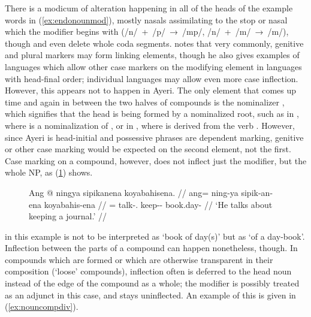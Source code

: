 There is a modicum of alteration happening in all of the heads of the example 
words in (\ref{ex:endonounmod}), mostly nasals assimilating to the stop or 
nasal which the modifier begins with (/n/~+~/p/~→~/mp/, /n/~+~/m/~→~/m/), 
though  and  even delete 
whole coda segments.
\citet[703]{bauer2001} notes that very commonly, genitive and plural markers 
may form linking elements, though he also gives examples of languages which
allow other case markers on the modifying element in languages with head-final
order; individual languages may allow even more case inflection. However, this
appears not to happen in Ayeri. The only element that comes up time and again
in between the two halves of compounds is the nominalizer ,
which signifies that the head is being formed by a nominalized root, such as in
, where  is a 
nominalization of , or in 
, where  is derived 
from the verb . However, since Ayeri is head-initial
and possessive phrases are dependent marking, genitive or other case marking
would be expected on the second element, not the first. Case marking on a
compound, however, does not inflect just the modifier, but the whole NP, as 
(\ref{ex:compinfl}) shows.

\begin{figure}[h]
\ex\label{ex:compinfl}\begingl
	\gla Ang @ ningya sipikanena koyabahisena. //
	\glb ang= ning-ya sipik-an-ena koyabahis-ena //
	\glc \AgtT{}= talk-\TsgM{}.\Top{} keep-\Nmlz{}-\Gen{} book.day-\Gen{} //
	\glft `He talks about keeping a journal.' //
\endgl\xe
\end{figure}

 in this example is not to be interpreted as 
`book of day(s)' but as `of a day-book'. Inflection between the parts of a
compound can happen nonetheless, though. In compounds which are formed  or which are otherwise transparent in their composition (`loose'
compounds\label{loosecomp}), inflection often is deferred to the head noun
instead of the edge of the compound as a whole; the modifier is possibly treated
as an adjunct in this case, and stays uninflected. An example of this is given
in (\ref{ex:nouncompdiv}).

